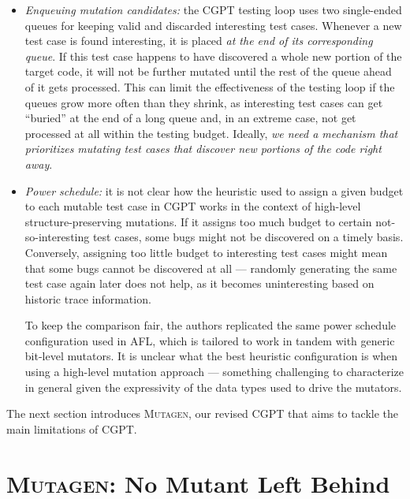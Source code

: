 \documentclass[sigconf, anonymous, review]{acmart}
\newcommand{\mutagen}{\textsc{Mutagen}\xspace}
\begin{document}
\begin{itemize}
\item \emph{Enqueuing mutation candidates:}
%
the CGPT testing loop uses two single-ended queues for keeping valid and
discarded interesting test cases.
%
Whenever a new test case is found interesting, it is placed \emph{at the end of
  its corresponding queue}.
%
If this test case happens to have discovered a whole new portion of the target
code, it will not be further mutated until the rest of the queue ahead of it
gets processed.
%
This can limit the effectiveness of the testing loop if the queues grow more
often than they shrink, as interesting test cases can get ``buried'' at the end
of a long queue and,
%
%
in an extreme case, not get processed at all within the testing budget.
%
Ideally, \emph{we need a mechanism that prioritizes mutating test cases that
  discover new portions of the code right away}.
%
%

\item \emph{Power schedule:}
%
it is not clear how the heuristic used to assign a given budget to each mutable
test case in CGPT works in the context of high-level structure-preserving
mutations.
%
If it assigns too much budget to certain not-so-interesting test cases, some
bugs might not be discovered on a timely basis.
%
Conversely, assigning too little budget to interesting test cases might mean
that some bugs cannot be discovered at all --- randomly generating the same test
case again later does not help, as it becomes uninteresting based on historic
trace information.

To keep the comparison fair, the authors replicated the same power schedule
configuration used in AFL, which is tailored to work in tandem with generic
bit-level mutators.
%
It is unclear what the best heuristic configuration is when using a high-level
mutation approach --- something challenging to characterize in general given the
expressivity of the data types used to drive the mutators.
\end{itemize}

The next section introduces \mutagen, our revised CGPT that aims to tackle the
main limitations of CGPT.


\section{\mutagen: No Mutant Left Behind}
\label{sec:mutagen}
\end{document}
